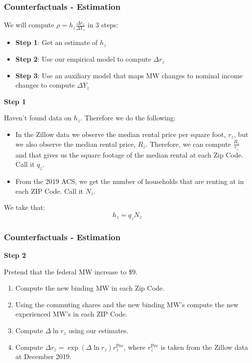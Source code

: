 \documentclass[aspectratio=169]{beamer}
\begin{document}
\begin{frame}
    \frametitle{Counterfactuals - Estimation}
    
    We will compute $\rho = h_z \frac{\Delta r_z}{\Delta Y_z}$ in 3 steps:
    \begin{itemize}
        \item \textbf{Step 1}: Get an estimate of $h_z$
        \item \textbf{Step 2}: Use our empirical model to compute $\Delta r_z$
        \item \textbf{Step 3}: Use an auxiliary model that maps MW changes to nominal income changes to compute $\Delta Y_z$
    \end{itemize}
    
    \pause
    
    \textbf{Step 1}
    
    Haven't found data on $h_z$. Therefore we do the following:
    
    \begin{itemize}
        \item In the Zillow data we observe the median rental price per square foot, $r_z$, but we also observe the median rental price, $R_z$.
        Therefore, we can compute $\frac{R_z}{r_z}$ and that gives us the square footage of the median rental at each Zip Code. Call it $q_z$.
        \item From the 2019 ACS, we get the number of households that are renting at in each ZIP Code. Call it $N_z$.
    \end{itemize}
    
    We take that:
    \[
    h_z = q_z N_z
    \]
\end{frame}

\begin{frame}
    \frametitle{Counterfactuals - Estimation}
    \textbf{Step 2}
    
    Pretend that the federal MW increase to \$9.
    \begin{enumerate}
        \item Compute the new binding MW in each Zip Code.
        \item Using the commuting shares and the new binding MW's compute the new experienced MW's in each ZIP Code.
        \item Compute $\Delta \ln r_z$ using our estimates.
        \item Compute $\Delta r_z = \exp(\Delta \ln r_z) r^\text{Pre}_z$, where $r^\text{Pre}_z$ is taken from the Zillow data 
        at December 2019. 
    \end{enumerate}  
\end{frame}
\end{document}
